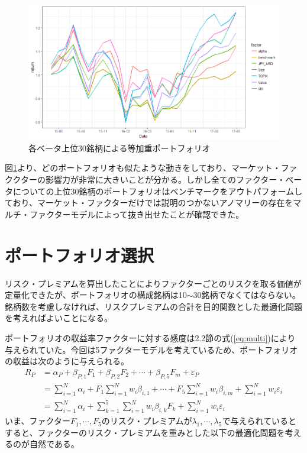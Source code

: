 \documentclass[11pt]{jreport}
\begin{document}
\begin{figure}[H]
	\begin{center}
		\includegraphics[width=15cm]{./fig/factor_top30.png}
		\caption{各ベータ上位30銘柄による等加重ポートフォリオ}
		\label{fig:factor_top30}
	\end{center}
\end{figure}

図\ref{fig:factor_top30}より、どのポートフォリオも似たような動きをしており、マーケット・ファククターの影響力が非常に大きいことが分かる。しかし全てのファクター・ベータについての上位30銘柄のポートフォリオはベンチマークをアウトパフォームしており、マーケット・ファクターだけでは説明のつかないアノマリーの存在をマルチ・ファクターモデルによって抜き出せたことが確認できた。

\section{ポートフォリオ選択}
リスク・プレミアムを算出したことによりファクターごとのリスクを取る価値が定量化できたが、ポートフォリオの構成銘柄は10$\sim$30銘柄でなくてはならない。銘柄数を考慮しなければ、リスクプレミアムの合計を目的関数とした最適化問題を考えればよいことになる。

ポートフォリオの収益率ファクターに対する感度は2.2節の式(\ref{eq:multi})により与えられていた。今回は5ファクターモデルを考えているため、ポートフォリオの収益は次のように与えられる。
\begin{equation}
\begin{split}
R_P &= \alpha_P + \beta_{P,1} F_1 + \beta_{P,2} F_2 + \cdots + \beta_{P,5} F_m + \varepsilon_P\\
&=\sum_{i=1}^N \alpha_i + F_1 \sum_{i=1}^N w_i \beta_{i,1} + \cdots + F_5 \sum_{i=1}^N w_i \beta_{i,m} + \sum_{i=1}^N w_i\varepsilon_i\\
&= \sum_{i=1}^N \alpha_i + \sum_{k=1}^5 \sum_{i=1}^N w_i \beta_{i,k} F_k + \sum_{i=1}^N w_i\varepsilon_i
\label{eq:port}
\end{split}
\end{equation}
いま、ファクター$F_1,\cdots,F_5$のリスク・プレミアムが$\lambda_1,\cdots,\lambda_5$で与えられているとすると、ファクターのリスク・プレミアムを重みとした以下の最適化問題を考えるのが自然である。
\end{document}
